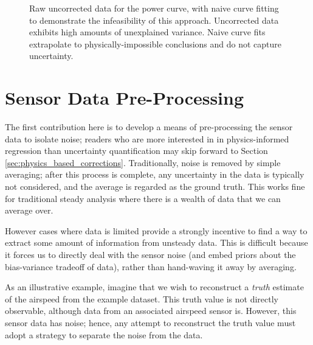 \begin{figure}[h]
    \centering
    \caption{Raw uncorrected data for the power curve, with naive curve fitting to demonstrate the infeasibility of this approach. Uncorrected data exhibits high amounts of unexplained variance. Naive curve fits extrapolate to physically-impossible conclusions and do not capture uncertainty.}
    \label{fig:power_curve_naive}
\end{figure}


\section{Sensor Data Pre-Processing}

The first contribution here is to develop a means of pre-processing the sensor data to isolate noise; readers who are more interested in in physics-informed regression than uncertainty quantification may skip forward to Section \ref{sec:physics_based_corrections}. Traditionally, noise is removed by simple averaging; after this process is complete, any uncertainty in the data is typically not considered, and the average is regarded as the ground truth. This works fine for traditional steady analysis where there is a wealth of data that we can average over.

However cases where data is limited provide a strongly incentive to find a way to extract some amount of information from unsteady data. This is difficult because it forces us to directly deal with the sensor noise (and embed priors about the bias-variance tradeoff of data), rather than hand-waving it away by averaging.

As an illustrative example, imagine that we wish to reconstruct a \emph{truth} estimate of the airspeed from the example dataset. This truth value is not directly observable, although data from an associated airspeed sensor is. However, this sensor data has noise; hence, any attempt to reconstruct the truth value must adopt a strategy to separate the noise from the data.

